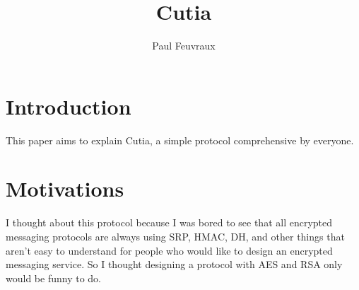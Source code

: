 \documentclass[a4paper,10pt]{article}
\title{Cutia}
\author{Paul Feuvraux}
\begin{document}
\maketitle

\section{Introduction}
This paper aims to explain Cutia, a simple protocol comprehensive by everyone.

\section{Motivations}
I thought about this protocol because I was bored to see that all encrypted messaging protocols are always using SRP, HMAC, DH, and other things that aren't easy to understand for people who would like to design an encrypted messaging service. So I thought designing a protocol with AES and RSA only would be funny to do.
\end{document}
